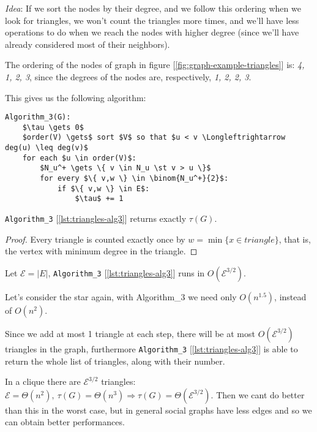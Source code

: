 \textit{Idea}: If we sort the nodes by their degree, and we follow this ordering when we look for triangles, we won't count the triangles more times, and we'll have less operations to do when we reach the nodes with higher degree (since we'll have already considered most of their neighbors).

\begin{ex}
    The ordering of the nodes of graph in figure [\ref{fig:graph-example-triangles}] is: \textit{4, 1, 2, 3}, since the degrees of the nodes are, respectively, \textit{1, 2, 2, 3}.
\end{ex}

This gives us the following algorithm:
\begin{lstlisting}[caption={Algorithm 2}, label={lst:triangles-alg3}]
Algorithm_3(G):
    $\tau \gets 0$
    $order(V) \gets$ sort $V$ so that $u < v \Longleftrightarrow  deg(u) \leq deg(v)$
    for each $u \in order(V)$:
        $N_u^+ \gets \{ v \in N_u \st v > u \}$
        for every $\{ v,w \} \in \binom{N_u^+}{2}$:
            if $\{ v,w \} \in E$:
                $\tau$ += 1
\end{lstlisting}

\begin{thm}\label{thm:triangles-2}
    \texttt{Algorithm\_3} [\ref{lst:triangles-alg3}] returns exactly $\tau(G)$.
\end{thm}
\begin{proof}
    Every triangle is counted exactly once by $w = \min \{ x \in triangle \}$, that is, the vertex with minimum degree in the triangle.
\end{proof}

\begin{thm}\label{thm:triangles-3}
    Let $\mathcal{E} = |E|$, \texttt{Algorithm\_3} [\ref{lst:triangles-alg3}] runs in $O(\mathcal{E}^{3/2})$.
\end{thm}

\ex Let's consider the star again, with Algorithm\_3 we need only $O(n^{1.5})$, instead of $O(n^2)$.

\obs Since we add at most 1 triangle at each step, there will be at most $O(\mathcal{E}^{3/2})$ triangles in the graph, furthermore \texttt{Algorithm\_3} [\ref{lst:triangles-alg3}] is able to return the whole list of triangles, along with their number.

\ex In a clique there are $\mathcal{E}^{3/2}$ triangles: $\mathcal{E} = \Theta(n^2),\ \tau(G) = \Theta(n^3) \Longrightarrow \tau(G) = \Theta(\mathcal{E}^{3/2})$. Then we cant do better than this in the worst case, but in general social graphs have less edges and so we can obtain better performances.

